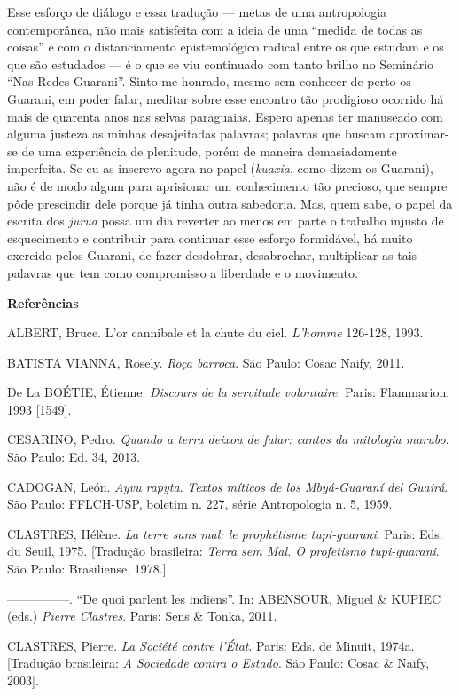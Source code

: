 Esse esforço de diálogo e essa tradução --- metas de uma antropologia
contemporânea, não mais satisfeita com a ideia de uma ``medida de todas
as coisas'' e com o distanciamento epistemológico radical entre os que
estudam e os que são estudados --- é o que se viu continuado com tanto
brilho no Seminário ``Nas Redes Guarani''. Sinto-me honrado, mesmo sem
conhecer de perto os Guarani, em poder falar, meditar sobre esse
encontro tão prodigioso ocorrido há mais de quarenta anos nas selvas
paraguaias. Espero apenas ter manuseado com alguma justeza as minhas
desajeitadas palavras; palavras que buscam aproximar-se de uma
experiência de plenitude, porém de maneira demasiadamente imperfeita. Se
eu as inscrevo agora no papel (\emph{kuaxia}, como dizem os Guarani),
não é de modo algum para aprisionar um conhecimento tão precioso, que
sempre pôde prescindir dele porque já tinha outra sabedoria. Mas, quem
sabe, o papel da escrita dos \emph{jurua} possa um dia reverter ao menos
em parte o trabalho injusto de esquecimento e contribuir para continuar
esse esforço formidável, há muito exercido pelos Guarani, de fazer
desdobrar, desabrochar, multiplicar as tais palavras que tem como
compromisso a liberdade e o movimento.

\textbf{Referências }

ALBERT, Bruce. L'or cannibale et la chute du ciel. \emph{L'homme}
126-128, 1993.

BATISTA VIANNA, Rosely. \emph{Roça barroca}. São Paulo: Cosac Naify,
2011.

De La BOÉTIE, Étienne. \emph{Discours de la servitude volontaire}.
Paris: Flammarion, 1993 {[}1549{]}.

CESARINO, Pedro. \emph{Quando a terra deixou de falar: cantos da
mitologia marubo}. São Paulo: Ed. 34, 2013.

CADOGAN, León. \emph{Ayvu rapyta}. \emph{Textos míticos de los
Mbyá-Guaraní del Guairá}. São Paulo: FFLCH-USP, boletim n. 227, série
Antropologia n. 5, 1959.

CLASTRES, Hélène. \emph{La terre sans mal: le prophétisme tupi-guarani}.
Paris: Eds. du Seuil, 1975. {[}Tradução brasileira: \emph{Terra sem Mal.
O profetismo tupi-guarani}. São Paulo: Brasiliense, 1978.{]}

---------------. ``De quoi parlent les indiens''. In: ABENSOUR, Miguel
\& KUPIEC (eds.) \emph{Pierre Clastres}. Paris: Sens \& Tonka, 2011.

CLASTRES, Pierre. \emph{La Société contre l'État}. Paris: Eds. de
Minuit, 1974a. {[}Tradução brasileira: \emph{A Sociedade contra o
Estado}. São Paulo: Cosac \& Naify, 2003{]}.

